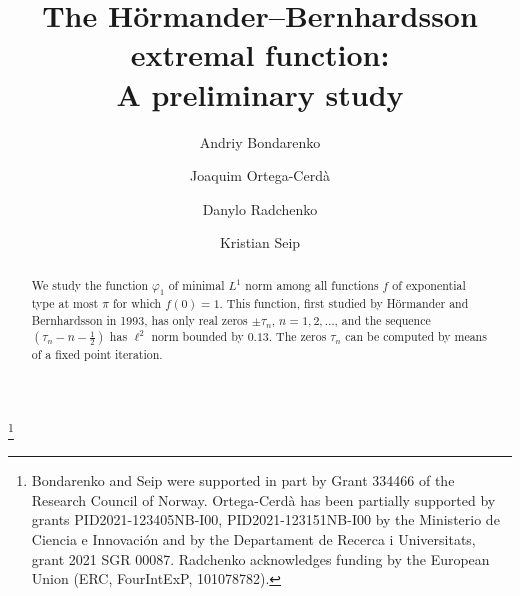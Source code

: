\documentclass[12pt]{amsart}
\theoremstyle{plain}
\begin{document}
 
\title[The H\"{o}rmander--Bernhardsson extremal function: A preliminary study]
{The H\"{o}rmander--Bernhardsson extremal function: \\ A preliminary study}

\author[A. Bondarenko]{Andriy Bondarenko}
\address{Department of Mathematical Sciences \\ Norwegian University of Science and Technology \\ NO-7491 Trondheim \\ Norway}

\author[J. Ortega-Cerd\`{a}]{Joaquim Ortega-Cerd\`{a}} 
\address{Department de Matem\`{a}tiques i Inform\`{a}tica, Universitat de 
Barcelona, Gran Via 585, 08007 Barcelona, Spain and
CRM, Centre de Recerca Matemàtica, Campus de Bellaterra Edifici C, 08193 
Bellaterra, Barcelona, Spain} 

\author[D. Radchenko]{Danylo Radchenko}
\address{Laboratoire Paul Painlev\'e \\ Universit\'e de Lille \\ F-59655 Villeneuve d'Ascq \\ France}

\author[K. Seip]{Kristian Seip} 
\address{Department of Mathematical Sciences, Norwegian University of Science and Technology (NTNU), 7491 Trondheim, Norway} 

\thanks{Bondarenko and Seip were supported in part by Grant 334466 of the 
Research Council of Norway. Ortega-Cerd\`{a} has been partially 
supported by grants  PID2021-123405NB-I00, PID2021-123151NB-I00 by the 
Ministerio de Ciencia e Innovación and by the Departament de Recerca i 
Universitats, grant 2021 SGR 00087. Radchenko acknowledges funding by the 
European Union (ERC, FourIntExP, 101078782).}

\begin{abstract}
We study the function $\varphi_1$ of minimal $L^1$ norm among all functions $f$ of exponential type at most $\pi$ for which $f(0)=1$. This function, first studied by H\"{o}rmander and Bernhardsson in 1993, has only real zeros $\pm \tau_n$, $n=1,2, \ldots$, and the sequence $(\tau_n-n-\frac12)$ has $\ell^2$ norm bounded by $0.13$. The zeros $\tau_n$ can be computed by means of a fixed point iteration. 
\end{abstract}

\maketitle
\end{document}

